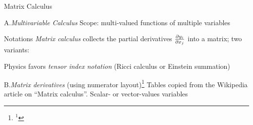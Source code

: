 

\beginsection Matrix Calculus

\item{A.}\emph{Multivariable Calculus}
 Scope: multi-valued functions of multiple variables\medskip

\iitem{}\vbox{\offinterlineskip
}

 Notations
\emph{Matrix calculus} collects the partial derivatives
${\partial y_i\over\partial x_j}$ into a matrix; two variants:\smallskip

\iiitem{}\vbox{\offinterlineskip
}

 Physics favors \emph{tensor index notation} (Ricci calculus or
Einstein summation)\smallskip
\item{B.}\emph{Matrix derivatives} (using numerator layout)\footnote{${}^1$}{
Tables copied from the Wikipedia article on ``Matrix calculus''.}
Scalar- or vector-values variables\medskip

